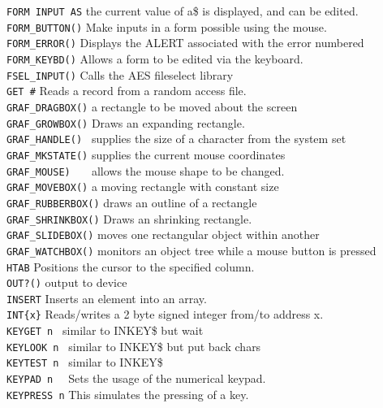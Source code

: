 \begin{tabbing}
\verb|FORM INPUT AS|\>   the current value of a\$ is displayed, and can be edited.\\
\verb|FORM_BUTTON()|\>   Make inputs in a form possible using the mouse.\\
\verb|FORM_ERROR()|\>    Displays the ALERT associated with the error numbered\\
\verb|FORM_KEYBD()|\>    Allows a form to be edited via the keyboard.\\
\verb|FSEL_INPUT()|\>    Calls the AES fileselect library\\
\verb|GET #|\>	      Reads a record from a random access file.\\
\verb|GRAF_DRAGBOX()|\>  a rectangle to be moved about the screen\\
\verb|GRAF_GROWBOX()|\>  Draws an expanding rectangle.\\
\verb|GRAF_HANDLE() |\>  supplies the size of a character from the system set\\
\verb|GRAF_MKSTATE()|\>  supplies the current mouse  coordinates\\
\verb|GRAF_MOUSE)   |\>  allows  the  mouse  shape  to  be  changed.\\
\verb|GRAF_MOVEBOX()|\>  a moving rectangle with constant size\\
\verb|GRAF_RUBBERBOX()|\> draws an outline of a rectangle\\
\verb|GRAF_SHRINKBOX()|\> Draws an shrinking rectangle.\\
\verb|GRAF_SLIDEBOX()|\>  moves one rectangular object within another\\
\verb|GRAF_WATCHBOX()|\>  monitors  an object tree while a mouse button  is  pressed\\
\verb|HTAB|\>	       Positions  the cursor to the  specified  column. \\  
\verb|OUT?()|\>  output to device\\
\verb|INSERT|\>	       Inserts  an  element  into  an  array.\\
\verb|INT{x}|\>	       Reads/writes a 2 byte signed integer from/to address x.\\
\verb|KEYGET n |\>        similar to INKEY\$  but wait\\
\verb|KEYLOOK n |\>       similar to INKEY\$  but put back chars\\
\verb|KEYTEST n |\>       similar to INKEY\$\\
\verb|KEYPAD n  |\>       Sets  the  usage of the  numerical  keypad.\\
\verb|KEYPRESS n|\>       This  simulates the pressing of a key.\\

\end{tabbing}

